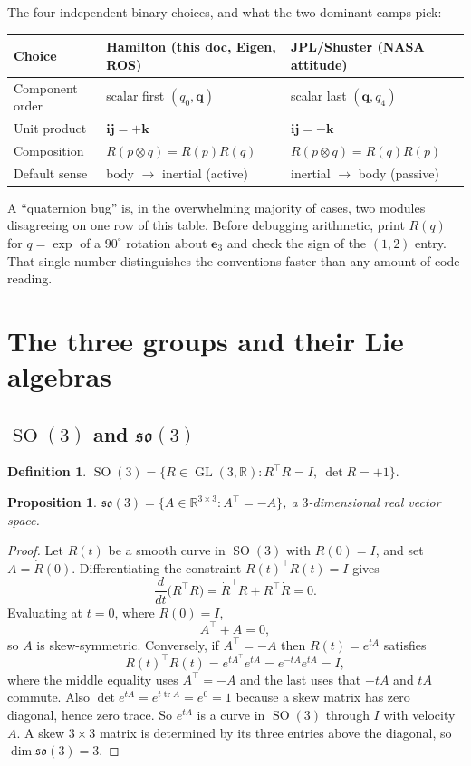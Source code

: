 \documentclass[11pt]{article}
\DeclareMathOperator{\tr}{tr}
\DeclareMathOperator{\SO}{SO}
\DeclareMathOperator{\GL}{GL}
\newcommand{\so}{\mathfrak{so}}
\newcommand{\R}{\mathbb{R}}
\newcommand{\vv}[1]{\bm{#1}}
\theoremstyle{plain}
\newtheorem{proposition}[theorem]{Proposition}
\theoremstyle{definition}
\newtheorem{definition}[theorem]{Definition}
\begin{document}
\begin{practical}
The four independent binary choices, and what the two dominant camps pick:

\smallskip
{\small\begin{tabular}{@{}lll@{}}
\hline
\textbf{Choice} & \textbf{Hamilton} (this doc, Eigen, ROS) & \textbf{JPL/Shuster} (NASA attitude)\\
\hline
Component order & scalar first $(q_0,\vv q)$ & scalar last $(\vv q,q_4)$\\
Unit product & $\mathbf i\mathbf j=+\mathbf k$ & $\mathbf i\mathbf j=-\mathbf k$\\
Composition & $R(p\otimes q)=R(p)R(q)$ & $R(p\otimes q)=R(q)R(p)$\\
Default sense & body $\to$ inertial (active) & inertial $\to$ body (passive)\\
\hline
\end{tabular}}
\smallskip

A ``quaternion bug'' is, in the overwhelming majority of cases, two modules disagreeing on one row
of this table. Before debugging arithmetic, print $R(q)$ for $q=\exp$ of a $90^\circ$ rotation
about $\vv e_3$ and check the sign of the $(1,2)$ entry. That single number distinguishes the
conventions faster than any amount of code reading.
\end{practical}

\section{The three groups and their Lie algebras}

\subsection{$\SO(3)$ and $\so(3)$}

\begin{definition}
$\SO(3)=\{R\in\GL(3,\R): R^{\!\top}R=I,\ \det R=+1\}$.
\end{definition}

\begin{proposition}\label{prop:so3}
$\so(3)=\{A\in\R^{3\times3}: A^{\!\top}=-A\}$, a $3$-dimensional real vector space.
\end{proposition}

\begin{proof}
Let $R(t)$ be a smooth curve in $\SO(3)$ with $R(0)=I$, and set $A=\dot R(0)$. Differentiating the
constraint $R(t)^{\!\top}R(t)=I$ gives
\[
\frac{d}{dt}\Big(R^{\!\top}R\Big)=\dot R^{\!\top}R+R^{\!\top}\dot R=0 .
\]
Evaluating at $t=0$, where $R(0)=I$,
\[
A^{\!\top}+A=0 ,
\]
so $A$ is skew-symmetric. Conversely, if $A^{\!\top}=-A$ then $R(t)=e^{tA}$ satisfies
\[
R(t)^{\!\top}R(t)=e^{tA^{\!\top}}e^{tA}=e^{-tA}e^{tA}=I,
\]
where the middle equality uses $A^{\!\top}=-A$ and the last uses that $-tA$ and $tA$ commute. Also
$\det e^{tA}=e^{t\tr A}=e^{0}=1$ because a skew matrix has zero diagonal, hence zero trace. So
$e^{tA}$ is a curve in $\SO(3)$ through $I$ with velocity $A$. A skew $3\times3$ matrix is
determined by its three entries above the diagonal, so $\dim\so(3)=3$.
\end{proof}
\end{document}

